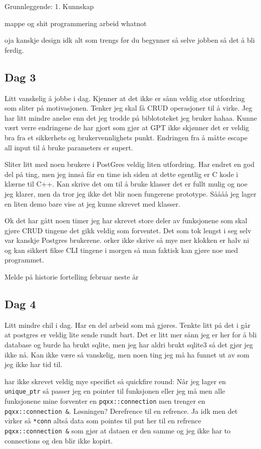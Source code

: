 \documentclass{article}
\begin{document}
Grunnleggende:
1. Kunnskap

mappe og shit
programmering arbeid whatnot

oja kanskje design idk alt som trengs før du begynner så selve jobben så det å bli ferdig.
\subsection{Dag 3}
Litt vanskelig å jobbe i dag. Kjenner at det ikke er sånn veldig stor utfordring som sliter på motivasjonen. Tenker jeg skal få CRUD operasjoner til å virke. Jeg har litt mindre anelse enn det jeg trodde på biblototeket jeg bruker hahaa. Kunne vært verre endringene de har gjort som gjør at GPT ikke skjønner det er veldig bra fra et sikkerhets og brukervennlighets punkt. Endringen fra å måtte escape all input til å bruke parameters er supert. 

Sliter litt med noen brukere i PostGres veldig liten utfordring. Har endret en god del på ting, men jeg innså får en time ish siden at dette egentlig er C kode i klærne til C++. Kan skrive det om til å bruke klasser det er fullt mulig og noe jeg klarer, men da tror jeg ikke det blir noen fungerene prototype. Såååå jeg lager en liten demo bare vise at jeg kunne skrevet med klasser.

Ok det har gått noen timer jeg har skrevet store deler av funksjonene som skal gjøre CRUD tingene det gikk veldig som forventet. Det som tok lengst i seg selv var kanskje Postgres brukerene. orker ikke skrive så mye mer klokken er halv ni og kan sikkert fikse CLI tingene i morgen så man faktisk kan gjøre noe med programmet.


Melde på historie fortelling februar neste år
\subsection{Dag 4}
Litt mindre chil i dag. Har en del arbeid som må gjøres. Tenkte litt på det i går at postgres er veldig lite sende rundt bart. Det er litt mer sånn jeg er her for å bli database og burde ha brukt sqlite, men jeg har aldri brukt sqlite3 så det gjør jeg ikke nå. Kan ikke være så vanskelig, men noen ting jeg må ha funnet ut av som jeg ikke har tid til.

har ikke skrevet veldig mye specifict så quickfire round:
Når jeg lager en \lstinline{unique_ptr} så passer jeg en pointer til funksjonen eller jeg må men alle funksjonene mine forventer en \lstinline{pqxx::connection} men trenger en \lstinline{pqxx::connection &}. Løsningen? Derefrence til en refrence. Ja idk men det virker så \lstinline{*conn} altså data som pointes til put her til en refrence \lstinline{pqxx::connection &} som gjør at dataen er den samme og jeg ikke har to connections og den blir ikke kopirt.
\end{document}
